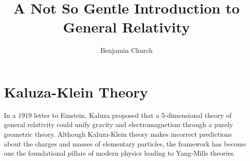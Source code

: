 \documentclass[11pt, a4paper]{article}
\begin{document}
\author{Benjamin Church}
\title{\Huge A Not So Gentle Introduction to General Relativity}

\newcommand{\R}{\mathbb{R}}
\renewcommand{\d}[1]{\mathrm{d}#1}
\newcommand{\dn}[2]{\mathrm{d}^{#1} #2}
\newcommand{\deriv}[2]{\frac{\d{#1}}{\d{#2}}}
\newcommand{\pderiv}[2]{\frac{\partial{#1}}{\partial{#2}}}
\newcommand{\nderiv}[3]{\frac{\d{^{#1} #2}}{\d{#3}^{#1}}}
\newcommand{\cderiv}[3]{\left(\frac{\partial{#1}}{\partial{#2}}\right)_{#3}}
\newcommand{\cobase}[1]{\vec{e}^{\, #1}}

\theoremstyle{theorem}
\newtheorem{theorem}{Theorem}[section]
\newtheorem{lemma}[theorem]{Lemma}
\newtheorem{corollary}[theorem]{Corollary}

\theoremstyle{definition}
\newtheorem*{problem}{Problem}

\theoremstyle{definition}
\newtheorem{example}{Example}[section]

\theoremstyle{definition}
\newtheorem{definition}{Definition}[section]

\theoremstyle{remark}
\newtheorem{remark}{Remark}[subsection]


\maketitle
\tableofcontents
\newpage


\section{Kaluza-Klein Theory}

In a 1919 letter to Einstein, Kaluza proposed that a 5-dimensional theory of general relativity could unify gravity and electromagnetism through a purely geometric theory. Although Kaluza-Klein theory makes incorrect predictions about the charges and masses of elementary particles, the framework has become one the foundational pillars of modern physics leading to Yang-Mills theories. 
\end{document}
